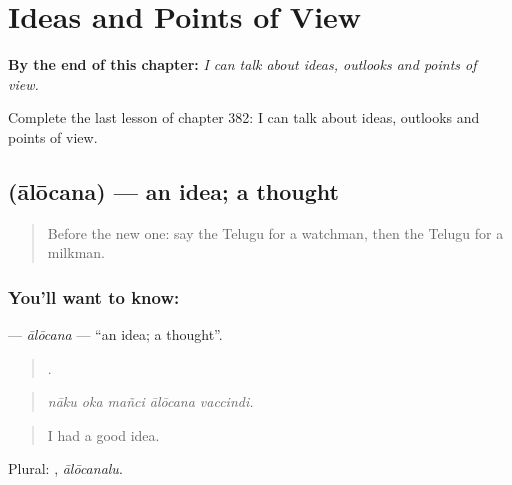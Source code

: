 
\chapter{Ideas and Points of View}
\label{ch:te-ideas-and-points-of-view}

\begin{chapteropening}
\textbf{By the end of this chapter:} \emph{I can talk about ideas, outlooks and points of view.}

Complete the last lesson of chapter 382: I can talk about ideas, outlooks and points of view.
\end{chapteropening}

\section[\texorpdfstring{\te{ఆలోచన} (ālōcana)}{ఆలోచన (ālōcana)}]{ (ālōcana) — an idea; a thought}

\label{lesson:TE-C382-alocana}



\begin{quote}
Before the new one: say the Telugu for a watchman, then the Telugu for a milkman.
\end{quote}

\subsection*{You'll want to know: }
\textbf{} — \emph{ālōcana} — \textquotedblleft{}an idea; a thought\textquotedblright{}.

\begin{quote}
    .
\end{quote}

\begin{quote}
\emph{nāku oka mañci ālōcana vaccindi.}
\end{quote}

\begin{quote}
I had a good idea.
\end{quote}

Plural: , \emph{ālōcanalu}.

